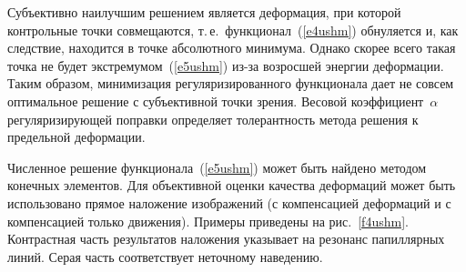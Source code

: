 \begin{multicols}{2}
      Субъективно наилучшим решением является деформация, при которой 
контрольные точки совмещаются, т.\,е.\ функционал~(\ref{e4ushm}) обнуляется и, как 
следствие, находится в точке абсолютного минимума. Однако скорее всего такая точка не 
будет экстремумом~(\ref{e5ushm}) из-за возросшей энергии деформации. Таким образом, 
минимизация регуляризированного функционала дает не совсем оптимальное решение с 
субъективной точки зрения. Весовой коэффициент~$\alpha$ регуляризирующей поправки 
определяет толерантность метода решения к предельной деформации.
      
      Численное решение функционала~(\ref{e5ushm}) может быть найдено методом 
конечных элементов. Для объективной оценки качества деформаций может быть 
использовано прямое наложение изоб\-ра\-же\-ний (с компенсацией деформаций и с 
компенсацией только движения). Примеры приведены на рис.~\ref{f4ushm}. Контрастная 
часть результатов наложения указывает на резонанс папиллярных линий. Серая часть 
соответствует неточному наведению.

\end{multicols}
      
      \begin{figure} %
      \vspace*{1pt}
\begin{center}
\mbox{%
\epsfxsize=163.871mm
}
\end{center}
\vspace*{-9pt}
\vspace*{6pt}
      \end{figure}
      
